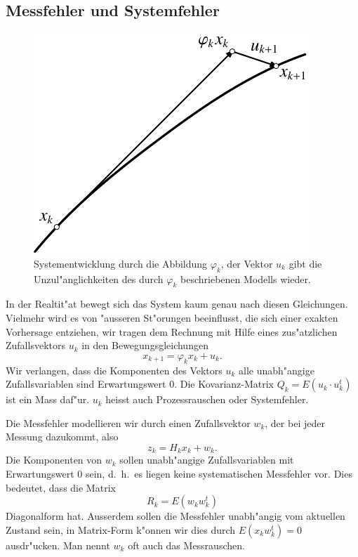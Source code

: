 \subsection{Messfehler und Systemfehler}
\begin{figure}
\centering
\includegraphics{images/filter-1.pdf}
\caption{Systementwicklung durch die Abbildung $\varphi_k$, der Vektor $u_k$
gibt die Unzul"anglichkeiten des durch $\varphi_k$ beschriebenen Modells
wieder.
\label{filter-systementwicklung}}
\end{figure}
In der Realtit"at bewegt sich das System kaum genau nach diesen Gleichungen.
Vielmehr wird es von "ausseren St"orungen beeinflusst, die sich einer
exakten Vorhersage entziehen, wir tragen dem Rechnung mit Hilfe eines
zus"atzlichen Zufallsvektors $u_k$ in den Bewegungsgleichungen
\[
x_{k+1}=\varphi_kx_k+ u_k.
\]
Wir verlangen, dass die Komponenten des Vektors $u_k$ alle unabh"angige
Zufallsvariablen sind Erwartungswert 0.
Die Kovarianz-Matrix $Q_k=E(u_k\cdot u_k^t)$ ist
ein Mass daf"ur. $u_k$ heisst auch Prozessrauschen oder Systemfehler.

Die Messfehler modellieren wir durch einen
Zufallsvektor $w_k$, der bei jeder Messung dazukommt, also
\[
z_k=H_kx_k+w_k.
\]
Die Komponenten von $w_k$ sollen unabh"angige Zufallsvariablen mit
Erwartungswert $0$ sein, d.~h.~es liegen keine systematischen Messfehler
vor. Dies bedeutet, dass die Matrix
\[
R_k=E(w_kw_k^t)
\]
Diagonalform hat.
Ausserdem sollen die Messfehler unabh"angig vom aktuellen Zustand
sein, in Matrix-Form k"onnen wir dies durch $E(x_kw_k^t)=0$ ausdr"ucken.
Man nennt $w_k$ oft auch das Messrauschen.

